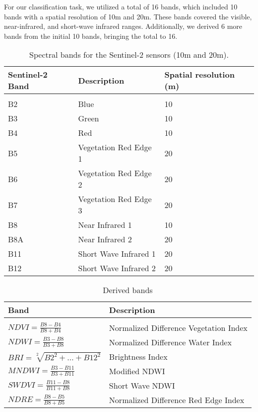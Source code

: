 For our classification task, we utilized a total of 16 bands, which included 10 bands with a spatial resolution of 10m and 20m.
These bands covered the visible, near-infrared, and short-wave infrared ranges.
Additionally, we derived 6 more bands from the initial 10 bands, bringing the total to 16.

\begin{table}[H]
  \centering
  \begin{tabular}{lll}
    Sentinel-2 Band & Description & Spatial resolution (m) \\[0.2cm]\hline \\[-0.2cm] 
    B2 &   Blue & 10\\
    B3 &   Green  & 10\\
    B4 &   Red  & 10\\
    B5 &   Vegetation Red Edge 1  & 20\\
    B6 &   Vegetation Red Edge 2  & 20\\
    B7 &   Vegetation Red Edge 3  & 20\\
    B8 &   Near Infrared 1  & 10\\
    B8A &  Near Infrared 2  & 20\\
    B11 &  Short Wave Infrared 1  & 20\\
    B12 &  Short Wave Infrared 2  & 20\\
  \end{tabular}
  \caption{Spectral bands for the Sentinel-2 sensors (10m and 20m).\cite{wiki:sentinel2}}
  \label{tab:bands}
\end{table}

\begin{table}[H]
  \centering
  \begin{tabular}{ll}
    Band & Description \\[0.2cm]\hline \\[-0.2cm] 
    $NDVI = \frac{B8-B4}{B8+B4}$ &   Normalized Difference Vegetation Index \\[0.2cm]
    $NDWI = \frac{B3-B8}{B3+B8}$  & Normalized Difference Water Index \\[0.2cm]
    $BRI = \sqrt[2]{B2^2 + \dots + B12^2} $  & Brightness Index \\[0.2cm]
    $MNDWI = \frac{B3-B11}{B3+B11}$ &   Modified NDWI \\[0.2cm]
    $SWDVI = \frac{B11-B8}{B11+B8}$ &   Short Wave NDWI \\[0.2cm]
    $NDRE = \frac{B8-B5}{B8+B5}$ &   Normalized Difference Red Edge Index \\[0.2cm]
  \end{tabular}
  \caption{Derived bands }
  \label{tab:derivedbands}
\end{table}


